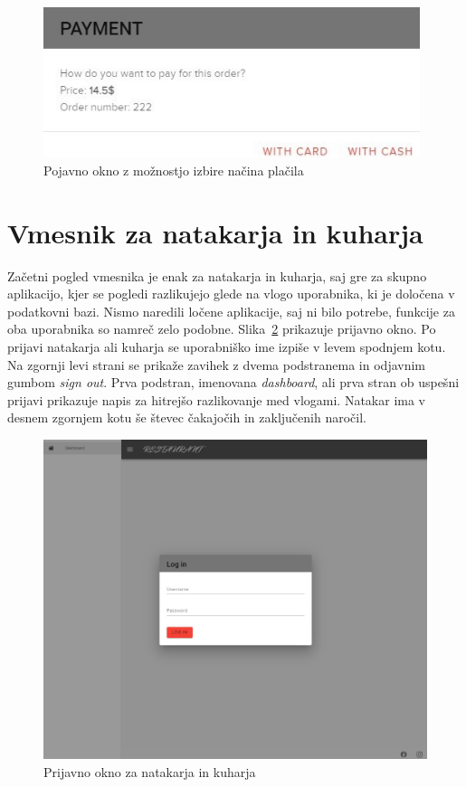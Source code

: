 \documentclass[a4paper, 12pt]{book}
\begin{document}
\begin{figure}[!htb]
\centering
\includegraphics[width=11cm]{gost_7.jpg}
\caption{Pojavno okno z možnostjo izbire načina plačila}
\label{Gost_7}
\end{figure}

\clearpage
\section{Vmesnik za natakarja in kuharja}
Začetni pogled vmesnika je enak za natakarja in kuharja, saj gre za skupno aplikacijo, kjer se pogledi razlikujejo glede na vlogo uporabnika, ki je določena v podatkovni bazi. Nismo naredili ločene aplikacije, saj ni bilo potrebe, funkcije za oba uporabnika so namreč zelo podobne. Slika~\ref{NatKuh_zac} prikazuje prijavno okno. Po prijavi natakarja ali kuharja se uporabniško ime izpiše v levem spodnjem kotu. Na zgornji levi strani se prikaže zavihek z dvema podstranema in odjavnim gumbom \textit{sign out}. Prva podstran, imenovana \textit{dashboard}, ali prva stran ob uspešni prijavi prikazuje napis za hitrejšo razlikovanje med vlogami. Natakar ima v desnem zgornjem kotu še števec čakajočih in zaključenih naročil.
\begin{figure}[!htb]
\centering
\includegraphics[width=13.7cm]{prijavno.jpg}
\caption{Prijavno okno za natakarja in kuharja}
\label{NatKuh_zac}
\end{figure}
\end{document}
